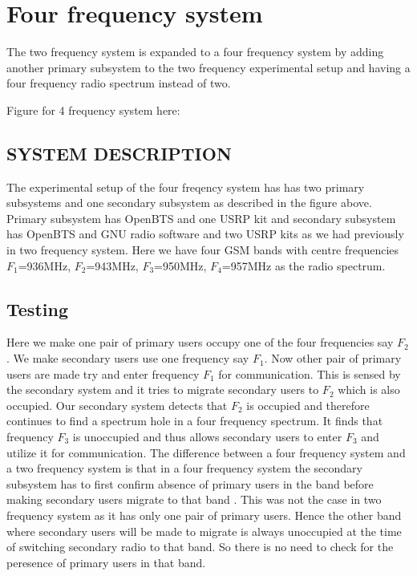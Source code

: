 \section{Four frequency system}
The two frequency system is expanded to a four frequency system by adding another primary subsystem to the two frequency experimental setup and having a four frequency radio spectrum instead of two. 


Figure for 4 frequency system here:

\subsection{SYSTEM DESCRIPTION}
 The experimental setup of the four freqency system has 
has two primary subsystems and one secondary subsystem as described in the figure above. Primary subsystem 
has OpenBTS and one USRP kit and secondary subsystem has OpenBTS and GNU radio 
software and two USRP kits as we had previously in two frequency system. Here we have four GSM bands with centre frequencies 
$F_1$=936MHz, $F_2$=943MHz, $F_3$=950MHz, $F_4$=957MHz as the radio spectrum.
 



\subsection{Testing}
Here we make one pair of primary users occupy one of the four frequencies say 
$F_2$. We make secondary users use one frequency say $F_1$. Now other pair of 
primary users are made try and enter frequency $F_1$ for communication. This is sensed by 
the secondary system and it tries to migrate secondary users to $F_2$ which is 
also occupied. Our secondary system detects that $F_2$ is occupied and therefore 
continues to find a spectrum hole in a four frequency spectrum. It finds that 
frequency $F_3$ is unoccupied and thus allows secondary users to enter $F_3$ 
and utilize it for communication. The difference between a four frequency 
system and a two frequency system is that in a four frequency 
system the secondary subsystem has to first confirm absence of primary users in the band before making secondary users migrate to that band . This was not the case in two frequency system as it has only one 
pair of primary users. Hence the other band where secondary users will be made to migrate is always unoccupied at the time of switching secondary radio to that band. So there is no need to check for the peresence of primary users in that band.

